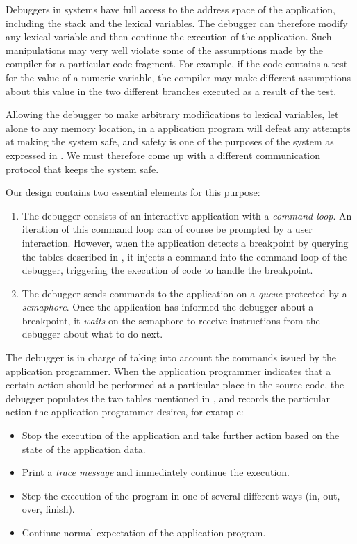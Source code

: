 Debuggers in \unix{} systems have full access to the address space of
the application, including the stack and the lexical variables.  The
debugger can therefore modify any lexical variable and then continue
the execution of the application.  Such manipulations may very well
violate some of the assumptions made by the compiler for a particular
code fragment.  For example, if the code contains a test for the value
of a numeric variable, the compiler may make different assumptions
about this value in the two different branches executed as a result of
the test.

Allowing the debugger to make arbitrary modifications to lexical
variables, let alone to any memory location, in a \commonlisp{}
application program will defeat any attempts at making the system
safe, and safety is one of the purposes of the \sicl{} system as
expressed in .  We must therefore come up
with a different communication protocol that keeps the system safe.

Our design contains two essential elements for this purpose:

\begin{enumerate}
\item The debugger consists of an interactive application with a
  \emph{command loop}.  An iteration of this command loop can of
  course be prompted by a user interaction.  However, when the
  application detects a breakpoint by querying the tables described in
  , it injects a command into the
  command loop of the debugger, triggering the execution of code to
  handle the breakpoint.
\item The debugger sends commands to the application on a \emph{queue}
  protected by a \emph{semaphore}.  Once the application has informed
  the debugger about a breakpoint, it \emph{waits} on the semaphore to
  receive instructions from the debugger about what to do next.
\end{enumerate}

The debugger is in charge of taking into account the commands issued
by the application programmer.  When the application programmer
indicates that a certain action should be performed at a particular
place in the source code, the debugger populates the two tables
mentioned in , and records the
particular action the application programmer desires, for example:

\begin{itemize}
\item Stop the execution of the application and take further action
  based on the state of the application data.
\item Print a \emph{trace message} and immediately continue the
  execution.
\item Step the execution of the program in one of several different
  ways (in, out, over, finish).
\item Continue normal expectation of the application program.
\end{itemize}

